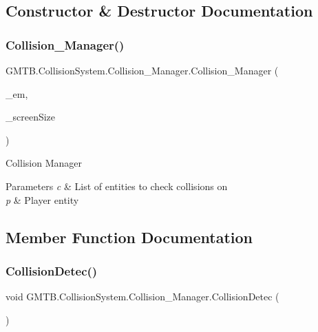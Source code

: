 \subsection{Constructor \& Destructor Documentation}
\mbox{\label{class_g_m_t_b_1_1_collision_system_1_1_collision___manager_aaaf93f4dcb6c695477622b09ed6f559a}} 
\subsubsection{\texorpdfstring{Collision\_Manager()}{Collision\_Manager()}}
{\footnotesize\ttfamily G\+M\+T\+B.\+Collision\+System.\+Collision\+\_\+\+Manager.\+Collision\+\_\+\+Manager (\begin{DoxyParamCaption}\item[{\mbox{\hyperlink{interface_g_m_t_b_1_1_interfaces_1_1_i_entity___manager}{I\+Entity\+\_\+\+Manager}}}]{\+\_\+em,  }\item[{Point}]{\+\_\+screen\+Size }\end{DoxyParamCaption})}



Collision Manager 


\begin{DoxyParams}{Parameters}
{\em c} & List of entities to check collisions on\\
\hline
{\em p} & Player entity\\
\hline
\end{DoxyParams}


\subsection{Member Function Documentation}
\mbox{\label{class_g_m_t_b_1_1_collision_system_1_1_collision___manager_ad8099362db997b483df87f5f168f3bce}} 
\subsubsection{\texorpdfstring{CollisionDetec()}{CollisionDetec()}}
{\footnotesize\ttfamily void G\+M\+T\+B.\+Collision\+System.\+Collision\+\_\+\+Manager.\+Collision\+Detec (\begin{DoxyParamCaption}{ }\end{DoxyParamCaption})}



